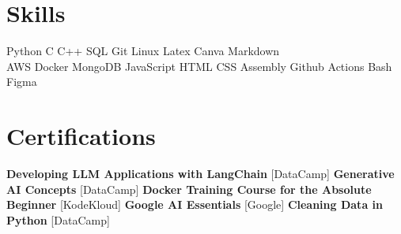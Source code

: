 \documentclass[]{resume-openfont}
\newcommand{\educationHeading}[4]{\runsubsection{#1}\hspace*{\fill}  \location{#3 | #4}\\
\descript{#2}\\}
\begin{document}


\section{Skills}
\begin{skillList}
     Python \textbullet{} C \textbullet{} C++ \textbullet{} SQL \textbullet{} Git \textbullet{} Linux \textbullet{} Latex \textbullet{} Canva \textbullet{} Markdown
    \\
     AWS \textbullet{} Docker \textbullet{} MongoDB \textbullet{} JavaScript \textbullet{} HTML \textbullet{} CSS \textbullet{} Assembly \textbullet{} Github Actions \textbullet{} Bash \textbullet{} Figma
\end{skillList}

\section{Certifications}
\textbf{Developing LLM Applications with LangChain} [DataCamp] \textbullet{} \textbf{Generative AI Concepts} [DataCamp] \textbullet{} \textbf{Docker Training Course for the Absolute Beginner} [KodeKloud] \textbullet{} \textbf{Google AI Essentials} [Google] \textbullet{} \textbf{Cleaning Data in Python} [DataCamp]
\end{document}
